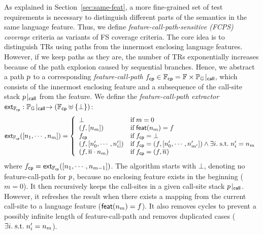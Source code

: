 As explained in Section~\ref{sec:same-feat}, a more fine-grained set of test
requirements is necessary to distinguish different parts of the semantics
in the same language feature.
Thus, we define \textit{feature-call-path-sensitive (FCPS)
coverage} criteria as variants of FS coverage criteria.
%
The core idea is to distinguish TRs using paths from the innermost enclosing language
features.
%
However, if we keep paths as they are, the number of TRs exponentially increases
because of the path explosion caused by sequential branches.
%
Hence, we abstract a path $p$ to a corresponding \textit{feature-call-path}
$f_{\textsf{cp}} \in \mathbb{F}_{\textsf{cp}} = \mathbb{F} \times {\mathbb{P}_{\mathbb{G}}}\!\mid_{\textsf{call}}$, which consists of
the innermost enclosing feature and a subsequence of the call-site stack ${p}\!\mid_{\textsf{call}}$
from the feature.
%
We define the \textit{feature-call-path extractor} $\textsf{ext}_{\mathbb{F}_{\textsf{cp}}}:
{\mathbb{P}_{\mathbb{G}}}\!\mid_{\textsf{call}} \rightarrow (\mathbb{F}_{\textsf{cp}} \uplus \{ \bot \})$:
%
\begin{equation}\label{equ:extfcp}
  \textsf{ext}_{\mathbb{F}_{\textsf{cp}}}([n_1, \cdots, n_m]) = \left\{
    \begin{array}{ll}
      \bot & \text{if} \; m = 0\\

      (f, [n_m]) & \text{if} \; \textsf{feat}(n_m) = f\\

      f_{\textsf{cp}} & \text{if} \; f_{\textsf{cp}} = \bot\\

      (f, [n'_0, \cdots, n'_i]) &
      \text{if} \; f_{\textsf{cp}} = (f, [n'_0, \cdots, n'_{m'}]) \wedge
      \exists i. {\; \text{s.t.} \; } n'_i = n_m\\

      (f, \overline{n} \cdot n_m) & \text{if} \; f_{\textsf{cp}} = (f, \overline{n})\\
    \end{array}
  \right.
\end{equation}
%
where $f_{\textsf{cp}} = \textsf{ext}_{\mathbb{F}_{\textsf{cp}}}([n_1, \cdots, n_{m-1}])$.
%
The algorithm starts with $\bot$, denoting no feature-call-path
for $p$, because no enclosing feature exists in the beginning ($m = 0$).
%
It then recursively keeps the call-sites in a given call-site
stack ${p}\!\mid_{\textsf{call}}$.
%
However, it refreshes the result when there exists a mapping from the current
call-site to a language feature ($\textsf{feat}(n_m) = f$).
%
It also removes cycles to prevent a possibly infinite
length of feature-call-path and removes duplicated cases ($\exists i. {\; \text{s.t.} \; }
n'_i = n_m$).



